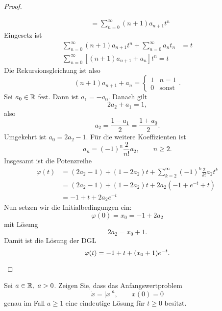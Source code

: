 \begin{proof}
\begin{parts}
\begin{align*}
		   &=\sum_{n=0}^\infty (n+1)a_{n+1}t^n
\end{align*}
Eingesetz ist
\begin{align*}
	\sum_{n=0}^\infty (n+1)a_{n+1}t^n + \sum_{n=0}^\infty a_n t_n&=t\\
	\sum_{n=0}^\infty \left[ (n+1)a_{n+1}+a_n \right]t^n = t
\end{align*}
Die Rekursionsgleichung ist also
\[
	(n+1)a_{n+1}+a_n = \begin{cases}
		1 & n = 1\\
		0 & \text{sonst}
	\end{cases}
.\]
Sei $a_0\in \mathbb{R}$ fest. Dann ist $a_1=-a_0$. Danach gilt
\[
2a_2+a_1 = 1
,\]
also
\[
a_2 = \frac{1-a_1}{2}=\frac{1+a_0}{2}
.\]
Umgekehrt ist $a_0 = 2a_2-1$. F\"{u}r die weitere Koeffizienten ist
\[
a_n = (-1)^n\frac{2}{n!}a_2,\qquad n \ge 2
.\] 
Insgesamt ist die Potenzreihe
\begin{align*}
	\varphi(t)&=(2a_2-1)+(1 - 2a_2)t + \sum_{k=2}^\infty (-1)^k \frac{2}{k!}a_2 t^k\\
		  &=(2a_2-1)+(1-2a_2)t+2a_2(-1+e^{-t}+t)\\
		  &=-1+t+2a_2 e^{-t}
\end{align*}
Nun setzen wir die Initialbedingungen ein:
\[
\varphi(0)=x_0=-1 + 2a_2
\]
mit L\"{o}sung
\[
2a_2 = x_0+1
.\] 
Damit ist die L\"{o}sung der DGL
\[
	\varphi(t) = -1 + t + (x_0+1)e^{-t}
.\qedhere\] 
	\end{parts}
\end{proof}
\begin{Problem}
	Sei $a\in \mathbb{R},~a>0$. Zeigen Sie, dass das Anfangswertproblem
	\[
		\dot{x}=|x|^a,\qquad x(0)=0
	\]
	genau im Fall $a\ge 1$ eine eindeutige L\"{o}sung f\"{u}r $t\ge 0$ besitzt.
\end{Problem}
